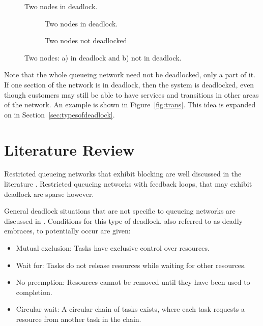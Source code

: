 \documentclass{article}
\begin{document}
\begin{figure}[!htbp]
  \begin{center}
  
  \caption{Two nodes in deadlock.}
  \label{fig:2in_deadlock}
  \end{center}
\end{figure}

\begin{figure}[!htbp]
\begin{subfigure}[b]{0.5\textwidth}
  
  \caption{Two nodes in deadlock.}
  \label{fig:inout_deadlock_in}
\end{subfigure}
\begin{subfigure}[b]{0.5\textwidth}
  
  \caption{Two nodes not deadlocked}
  \label{fig:inout_deadlock_out}
\end{subfigure}
\caption{Two nodes: a) in deadlock and b) not in deadlock.}
\label{fig:inout_deadlock}
\end{figure}

Note that the whole queueing network need not be deadlocked, only a part of it.
If one section of the network is in deadlock, then the system is deadlocked, even though customers may still be able to have services and transitions in other areas of the network.
An example is shown in Figure~\ref{fig:trans}.
This idea is expanded on in Section~\ref{sec:typesofdeadlock}.

\section{Literature Review}\label{sec:litreview}

Restricted queueing networks that exhibit blocking are well discussed in the literature \cite{hunt56, baber08, aviitzhakyadin65, takahashi80, koizumietal05, latoucheneuts80, korporaaletal00}. Restricted queueing networks with feedback loops, that may exhibit deadlock are sparse however.

General deadlock situations that are not specific to queueing networks are discussed in \cite{coffmanelphick71}.
Conditions for this type of deadlock, also referred to as deadly embraces, to potentially occur are given:
\begin{itemize}
  \item Mutual exclusion: Tasks have exclusive control over resources.
  \item Wait for: Tasks do not release resources while waiting for other resources.
  \item No preemption: Resources cannot be removed until they have been used to completion.
  \item Circular wait: A circular chain of tasks exists, where each task requests a resource from another task in the chain.
\end{itemize}
\end{document}
